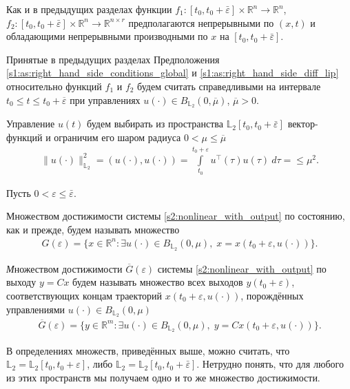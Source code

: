 \documentclass[../main.tex]{subfiles}
\begin{document}
Как и в предыдущих разделах функции $ f_1: [t_0, t_0 + \bar{\varepsilon}] \times \mathbb{R}^{n} \rightarrow \mathbb{R}^{n} $, $ f_2: [t_0, t_0 + \bar{\varepsilon}] \times \mathbb{R}^{n} \rightarrow \mathbb{R}^{n \times r} $ предполагаются непрерывными по $(x, t)$ и обладающими непрерывными производными по $x$ на $ [t_0, t_0 + \bar{\varepsilon}]$. 

Принятые в предыдущих разделах Предположения \ref{s1:as:right_hand_side_conditions_global} и \ref{s1:as:right_hand_side_diff_lip} относительно функций $f_1$ и $f_2$ будем считать справедливыми на интервале $t_0 \leqslant t \leqslant t_0 + \overline{\varepsilon} $ при управлениях $u(\cdot) \in B_{\mathbb{L}_2}(0, \overline{\mu}) $, $\overline{\mu} > 0$.

 Управление $u(t)$ будем выбирать из
пространства $\mathbb{L}_2[t_0,t_0+\bar{\varepsilon}]$ вектор-функций и ограничим его шаром радиуса $ 0 < \mu \leqslant \overline{\mu} $
\begin{gather}\label{s2:constrY}
 \lVert u(\cdot)\rVert^2_{\mathbb{L}_2} = \left(u(\cdot),u(\cdot) \right) = \int\limits_{t_0}^{t_0 + \varepsilon} u^{\top}(\tau) u(\tau) \ d\tau = \leqslant \mu^2.
\end{gather}

Пусть $ 0 < \varepsilon \leqslant \bar{\varepsilon} $. 

Множеством достижимости системы \eqref{s2:nonlinear_with_output} по состоянию, как и прежде, будем называть множество 
\begin{gather*}
 G(\varepsilon)=\{x\in \mathbb{R}^n:\exists u(\cdot)\in B_{\mathbb{L}_2}(0,\mu),\; x=x(t_0+\varepsilon, u(\cdot))\}.
\end{gather*}


\begin{definition}
 {\textit Множеством достижимости $\overline{G}(\varepsilon)$ системы \eqref{s2:nonlinear_with_output} по выходу} $ y = C x $ будем называть множество всех выходов $ y(t_0+\varepsilon) $,
 соответствующих концам траекторий $ x(t_0+\varepsilon, u(\cdot)) $, порождённых управлениями $ u(\cdot) \in B_{\mathbb{L}_2}(0,\mu)$
 \begin{gather*}
 \overline{G}(\varepsilon)=\{y\in \mathbb{R}^m:\exists u(\cdot)\in B_{\mathbb{L}_2}(0,\mu),\; y=Cx(t_0+\varepsilon, u(\cdot))\}.
 \end{gather*}
\end{definition}

В определениях множеств, приведённых выше, можно считать, что $ \mathbb{L}_2 =\mathbb{L}_2[t_0,t_0+\varepsilon] $, либо $ \mathbb{L}_2=\mathbb{L}_2[t_0,t_0+\bar{\varepsilon}] $.
Нетрудно понять, что для любого из этих пространств мы получаем одно и то же множество достижимости. 
 
\end{document}
